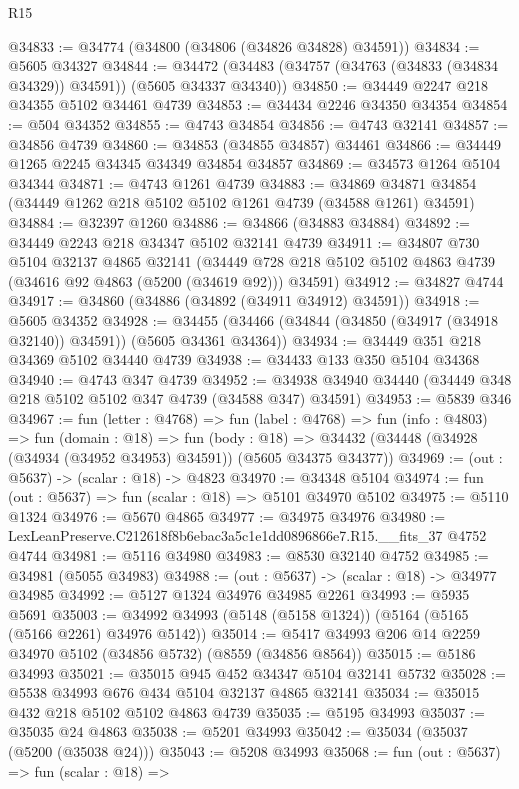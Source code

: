 \begin{lexlean}{R15}
\begin{coremodule}
{{{{{{{{{{{@34833 := @34774 (@34800 (@34806 (@34826 @34828) @34591))
@34834 := @5605 @34327
@34844 := @34472 (@34483 (@34757 (@34763 (@34833 (@34834 @34329)) @34591)) (@5605 @34337 @34340))
@34850 := @34449 @2247 @218 @34355 @5102 @34461 @4739
@34853 := @34434 @2246 @34350 @34354
@34854 := @504 @34352
@34855 := @4743 @34854
@34856 := @4743 @32141
@34857 := @34856 @4739
@34860 := @34853 (@34855 @34857) @34461
@34866 := @34449 @1265 @2245 @34345 @34349 @34854 @34857
@34869 := @34573 @1264 @5104 @34344
@34871 := @4743 @1261 @4739
@34883 := @34869 @34871 @34854 (@34449 @1262 @218 @5102 @5102 @1261 @4739 (@34588 @1261) @34591)
@34884 := @32397 @1260
@34886 := @34866 (@34883 @34884)
@34892 := @34449 @2243 @218 @34347 @5102 @32141 @4739
@34911 := @34807
    @730
    @5104
    @32137
    @4865
    @32141
    (@34449 @728 @218 @5102 @5102 @4863 @4739 (@34616 @92 @4863 (@5200 (@34619 @92))) @34591)
@34912 := @34827 @4744
@34917 := @34860 (@34886 (@34892 (@34911 @34912) @34591))
@34918 := @5605 @34352
@34928 := @34455 (@34466 (@34844 (@34850 (@34917 (@34918 @32140)) @34591)) (@5605 @34361 @34364))
@34934 := @34449 @351 @218 @34369 @5102 @34440 @4739
@34938 := @34433 @133 @350 @5104 @34368
@34940 := @4743 @347 @4739
@34952 := @34938 @34940 @34440 (@34449 @348 @218 @5102 @5102 @347 @4739 (@34588 @347) @34591)
@34953 := @5839 @346
@34967 := fun (letter : @4768) =>
  fun (label : @4768) =>
  fun (info : @4803) =>
  fun (domain : @18) =>
  fun (body : @18) => @34432 (@34448 (@34928 (@34934 (@34952 @34953) @34591)) (@5605 @34375 @34377))
@34969 := (out : @5637) -> (scalar : @18) -> @4823
@34970 := @34348 @5104
@34974 := fun (out : @5637) => fun (scalar : @18) => @5101 @34970 @5102
@34975 := @5110 @1324
@34976 := @5670 @4865
@34977 := @34975 @34976
@34980 := LexLeanPreserve.C212618f8b6ebac3a5c1e1dd0896866e7.R15.__fits_37 @4752 @4744
@34981 := @5116 @34980
@34983 := @8530 @32140 @4752
@34985 := @34981 (@5055 @34983)
@34988 := (out : @5637) -> (scalar : @18) -> @34977 @34985
@34992 := @5127 @1324 @34976 @34985 @2261
@34993 := @5935 @5691
@35003 := @34992 @34993 (@5148 (@5158 @1324)) (@5164 (@5165 (@5166 @2261) @34976 @5142))
@35014 := @5417 @34993 @206 @14 @2259 @34970 @5102 (@34856 @5732) (@8559 (@34856 @8564))
@35015 := @5186 @34993
@35021 := @35015 @945 @452 @34347 @5104 @32141 @5732
@35028 := @5538 @34993 @676 @434 @5104 @32137 @4865 @32141
@35034 := @35015 @432 @218 @5102 @5102 @4863 @4739
@35035 := @5195 @34993
@35037 := @35035 @24 @4863
@35038 := @5201 @34993
@35042 := @35034 (@35037 (@5200 (@35038 @24)))
@35043 := @5208 @34993
@35068 := fun (out : @5637) =>
  fun (scalar : @18) =>
}}}}}}}}}}}
\end{coremodule}
\end{lexlean}
